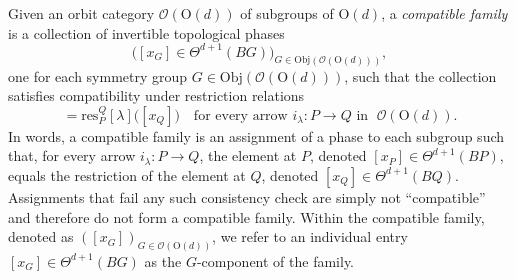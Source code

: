 \documentclass[aps,prx,reprint,superscriptaddress,twocolumn,amsmath,amssymb,amsfonts, nofootinbib]{revtex4-2}
\newcommand{\res}{\text{res}}
\theoremstyle{apsstyle}
\begin{document}
Given an orbit category $\mathcal O(\mathrm{O}(d))$ of subgroups of $\mathrm{O}(d)$, a \emph{compatible family} is a collection of invertible topological phases
\begin{equation*}
   \bigl([x_G] \in \Theta^{d+1}(BG)\bigr)_{G \in\mathrm{Obj}(\mathcal O(\mathrm{O}(d)))},
\end{equation*}
one for each symmetry group $G\in \mathrm{Obj}(\mathcal O(\mathrm{O}(d)))$, such that the collection satisfies compatibility under restriction relations
\begin{equation*}
   [x_P]=\res^{Q}_{P}[\lambda]\bigl([x_Q]\bigr)
   \quad\text{for every arrow }i_{\lambda}: P\longrightarrow Q\text{ in }\;\mathcal O(\mathrm{O}(d)).
\end{equation*} 
In words, a compatible family is an assignment of a phase to each subgroup such that, for every arrow $i_\lambda:P\to Q$, the element at $P$, denoted $[x_{P}]\in \Theta^{d+1}(BP)$, equals the restriction of the element at $Q$, denoted $[x_{Q}]\in \Theta^{d+1}(BQ)$. Assignments that fail any such consistency check are simply not “compatible” and therefore do not form a compatible family. Within the compatible family, denoted as $([x_{G}])_{G\in \mathcal{O}(\mathrm{O}(d))}$, we refer to an individual entry $[x_{G}]\in\Theta^{d+1}(BG)$ as the $G$-component of the family.

\bigskip 
\end{document}
